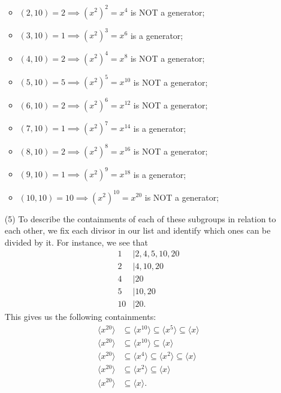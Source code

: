 \begin{eg}
\begin{enumerate}
\begin{itemize}
                \item \( (2,10) = 2  \implies (x^{2})^{2} = x^{4} \) is NOT a generator;
                \item \( (3,10) = 1 \implies (x^{2})^{3} = x^{6} \) is a generator;
                \item \( (4,10) = 2 \implies (x^{2})^{4} = x^{8} \) is NOT a generator;
                \item \( (5,10) = 5 \implies (x^{2})^{5} = x^{10} \) is NOT a generator;
                \item \( (6,10) = 2 \implies (x^{2})^{6} = x^{12} \) is NOT a generator;
                \item \( (7,10) = 1 \implies (x^{2})^{7} = x^{14} \) is a generator;
                \item \( (8,10) = 2 \implies (x^{2})^{8} = x^{16} \) is NOT a generator;
                \item \( (9,10) = 1 \implies (x^{2})^{9} = x^{18} \) is a generator;
                \item \( (10,10) = 10 \implies (x^{2})^{10} = x^{20} \) is NOT a generator;
            \end{itemize}
        \item[(5)] To describe the containments of each of these subgroups in relation to each other, we fix each divisor in our list and identify which ones can be divided by it. For instance, we see that  
            \begin{align*}
                1 &\mid 2,4,5,10,20 \\
                2 &\mid 4,10,20 \\
                4 &\mid 20 \\
                5 &\mid 10,20 \\
                10 &\mid 20.
            \end{align*}
            This gives us the following containments:
            \begin{align*}
               \langle x^{20} \rangle &\subseteq \langle x^{10} \rangle \subseteq  \langle x^{5} \rangle \subseteq  \langle x  \rangle \\
               \langle x^{20} \rangle &\subseteq \langle x^{10} \rangle \subseteq \langle x  \rangle \\
               \langle x^{20} \rangle &\subseteq \langle x^{4} \rangle \subseteq  \langle x^{2}  \rangle \subseteq  \langle x \rangle \\
               \langle x^{20} \rangle &\subseteq \langle x^{2} \rangle \subseteq  \langle x \rangle \\
               \langle x^{20} \rangle &\subseteq \langle x  \rangle.
            \end{align*}
    \end{enumerate}
\end{eg}


